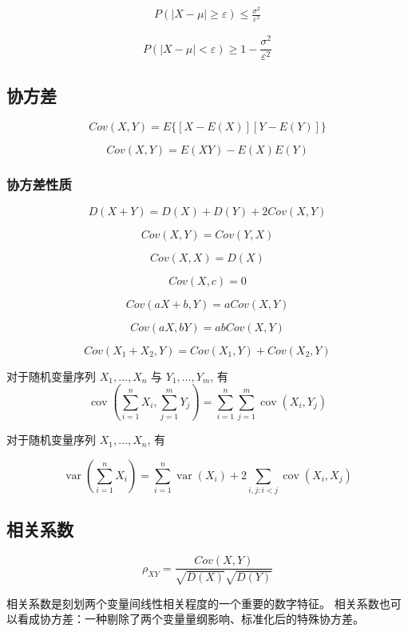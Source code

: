 \begin{theorem}[切比雪夫不等式]
    \label{Chebyshev\'sInequality}
$$
\begin{aligned}
    P(|X-\mu| \ge \varepsilon) \le \frac{\sigma^2}{\varepsilon^2}
\end{aligned}
$$

$$
 P(|X-\mu| < \varepsilon) \ge 1 - \frac{\sigma^2}{\varepsilon^2}
$$
\end{theorem}

\subsection{协方差}

$$
 Cov(X,Y) = E\Big\{ [X - E(X)][Y-E(Y)] \Big\}
$$

$$
 Cov(X,Y) = E(XY) - E(X)E(Y)
$$

\subsubsection{协方差性质}

$$
 D(X+Y) = D(X)+D(Y)+2Cov(X,Y)
$$

$$
 Cov(X,Y) = Cov(Y,X)
$$

$$
 Cov(X,X) = D(X)
$$

$$ Cov(X,c) = 0 $$

$$ Cov(a X + b, Y) = a Cov( X,Y) $$

$$ Cov(aX, bY) = ab Cov(X, Y) $$

$$ Cov(X_1 + X_2 , Y) = Cov(X_1 , Y) + Cov(X_2 , Y) $$

对于随机变量序列 $ X_{1}, \ldots, X_{n} $ 与 $ Y_{1}, \ldots, Y_{m} $, 有
$$
\operatorname{cov}\left(\sum_{i=1}^{n} X_{i}, \sum_{j=1}^{m} Y_{j}\right)=\sum_{i=1}^{n} \sum_{j=1}^{m} \operatorname{cov}\left(X_{i}, Y_{j}\right)
$$

对于随机变量序列 $ X_{1}, \ldots, X_{n} $, 有

$$
\operatorname{var}\left(\sum_{i=1}^{n} X_{i}\right)=\sum_{i=1}^{n} \operatorname{var}\left(X_{i}\right)+2 \sum_{i, j: i<j} \operatorname{cov}\left(X_{i}, X_{j}\right)
$$

\subsection{相关系数}

$$
 \rho_{XY} =   \frac{Cov(X,Y) }{\sqrt{D(X)} \sqrt{D(Y)}}
$$

相关系数是刻划两个变量间线性相关程度的一个重要的数字特征。 相关系数也可以看成协方差：一种剔除了两个变量量纲影响、标准化后的特殊协方差。 

